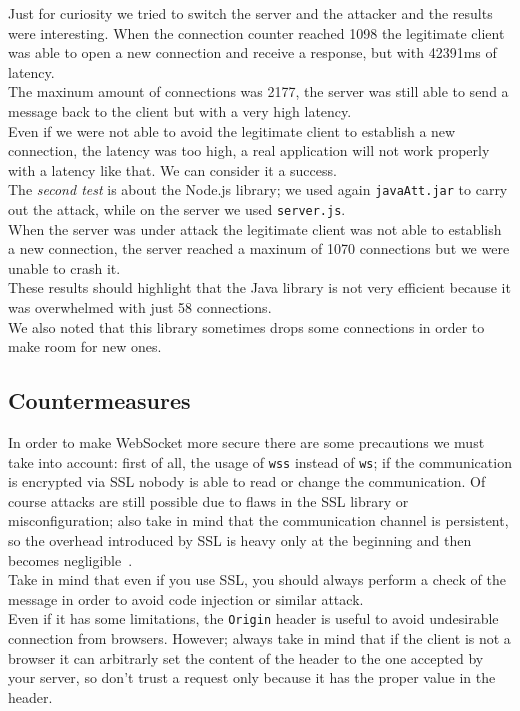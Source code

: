 	Just for curiosity we tried to switch the server and the attacker and the results were interesting. When the connection counter reached 1098
	the legitimate client was able to open a new connection and receive a response, but with 42391ms of latency.\\
	The maxinum amount of connections was 2177, the server was still able to send a message back to the client but with a very high latency.\\
	Even if we were not able to avoid the legitimate client to establish a new connection, the latency was too high, a real application
	will not work properly with a latency like that. We can consider it a success.\\

	The \emph{second test} is about the Node.js library; we used again \texttt{javaAtt.jar} to carry out the attack, while on the server we used \texttt{server.js}.\\
	When the server was under attack the legitimate client was not able to establish a new connection, the server reached a maxinum of 1070 connections 
	but we were unable to crash it.\\
	These results should highlight that the Java library is not very efficient because it was overwhelmed with just 58 connections.\\
	We also noted that this library sometimes drops some connections in order to make room for new ones.\\
	

	\subsection{Countermeasures}
	In order to make WebSocket more secure there are some precautions we must take into account: first of all, the usage of \texttt{wss} instead of \texttt{ws}; if the
	communication is encrypted via SSL nobody is able to read or change the communication. Of course attacks are still possible due to flaws in the SSL library or misconfiguration;
	also take in mind that the communication channel is persistent, so the overhead introduced by SSL is heavy only at the beginning and then becomes negligible~\cite{koch2013websockets}.\\
	Take in mind that even if you use SSL, you should always perform a check of the message in order to avoid code injection or similar attack.\\
	
	Even if it has some limitations, the \texttt{Origin} header is useful to avoid undesirable connection from browsers. However; always take in
	mind that if the client is not a browser it can arbitrarly set the content of the header to the one accepted by your server, so don't trust a request only because it has the proper
	value in the header.\\
	
